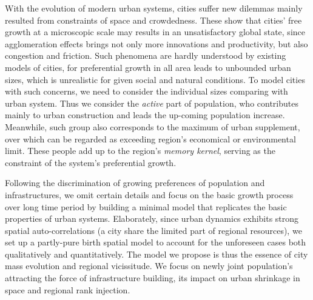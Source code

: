 \documentclass[reprint,unsortedaddress,amsmath,amssymb,aps,prl,showkeys]{revtex4-2}
\begin{document}
With the evolution of modern urban systems, cities suffer new dilemmas mainly resulted from constraints of space and crowdedness\cite{haase2014conceptualizing,martinez2012shrinking, PhysRevLett.120.108701,manoli2019magnitude}. These show that cities' free growth at a microscopic scale may results in an unsatisfactory global state, since agglomeration effects\cite{batty2013new} brings not only more innovations and productivity, but also congestion and friction. 
Such phenomena are hardly understood by existing models of cities, for preferential growth in all area leads to unbounded urban sizes, which is unrealistic for given social and natural conditions. To model cities with such concerns, we need to consider the individual sizes comparing with urban system. Thus we consider the \emph{active} part of population, who contributes mainly to urban construction and leads the up-coming population increase. Meanwhile, such group also corresponds to the maximum of urban supplement, over which can be regarded as exceeding region's economical or environmental limit. These people add up to the region's \emph{memory kernel}, serving as the constraint of the system's preferential growth\cite{PhysRevE.97.022132}.

Following the discrimination of growing preferences of population and infrastructures, we omit certain details and focus on the basic growth process over long time period by building a minimal model that replicates the basic properties of urban systems. Elaborately, since urban dynamics exhibits strong spatial auto-correlations (a city share the limited part of regional resources), we set up a partly-pure birth spatial model to account for the unforeseen cases both qualitatively and quantitatively. The model we propose is thus the essence of city mass evolution and regional vicissitude. We focus on newly joint population's attracting the force of infrastructure building, its impact on urban shrinkage in space and regional rank injection. 

\end{document}
